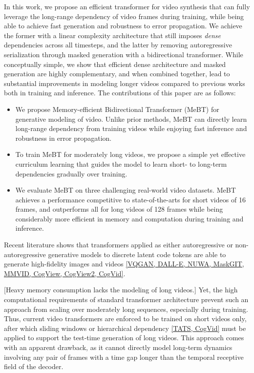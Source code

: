 \documentclass[10pt,twocolumn,letterpaper]{article}
\begin{document}
In this work, we propose an efficient transformer for video synthesis that can fully leverage the long-range dependency of video frames during training, while being able to achieve fast generation and robustness to error propagation.
We achieve the former with a linear complexity architecture that still imposes \emph{dense} dependencies across all timesteps, and the latter by removing autoregressive serialization through masked generation with a bidirectional transformer.
While conceptually simple, we show that efficient dense architecture and masked generation are highly complementary, and when combined together, lead to substantial improvements in modeling longer videos compared to previous works both in training and inference.
The contributions of this paper are as follows:
\begin{itemize}
    \item We propose Memory-efficient Bidirectional Transformer (MeBT) for generative modeling of video.
    Unlike prior methods, MeBT can directly learn long-range dependency from training videos while enjoying fast inference and robustness in error propagation.
    \item To train MeBT for moderately long videos, we propose a simple yet effective curriculum learning that guides the model to learn short- to long-term dependencies gradually over training.
\item We evaluate MeBT on three challenging real-world video datasets.
    MeBT achieves a performance competitive to state-of-the-arts for short videos of 16 frames, and outperforms all for long videos of 128 frames while being considerably more efficient in memory and computation during training and inference.
\end{itemize}

Recent literature shows that transformers applied as either autoregressive or non-autoregressive generative models to discrete latent code tokens are able to generate high-fidelity images and videos \ref{VQGAN, DALL-E, NUWA, MaskGIT, MMVID, CogView, CogView2, CogVid}.

[Heavy memory consumption lacks the modeling of long videos.]
Yet, the high computational requirements of standard transformer architecture prevent such an approach from scaling over moderately long sequences, especially during training.
Thus, current video transformers are enforced to be trained on short videos only, after which sliding windows or hierarchical dependency \ref{TATS, CogVid} must be applied to support the test-time generation of long videos.
This approach comes with an apparent drawback, as it cannot directly model long-term dynamics involving any pair of frames with a time gap longer than the temporal receptive field of the decoder.
\end{document}

